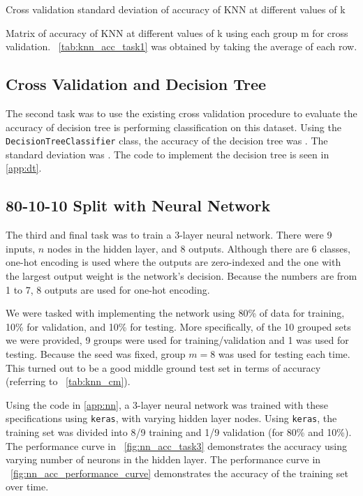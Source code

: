 \documentclass[paper=a4, fontsize=11pt,twoside]{scrartcl}	%
\newcommand{\figref}[1]{\figurename~\ref{#1}}
\newcommand{\tabref}[1]{\tablename~\ref{#1}}
\begin{document}
\begin{table}[!t!h]
	\centering
	
	\caption{Cross validation standard deviation of accuracy of KNN at different values of k}
	\label{tab:knn_std_task1}
\end{table}

\begin{table}[!t!h]
	\centering
	
	\caption{Matrix of accuracy of KNN at different values of k using each group m for cross validation. \tabref{tab:knn_acc_task1} was obtained by taking the average of each row.}
	\label{tab:knn_cm}
\end{table}

\subsection{Cross Validation and Decision Tree}
The second task was to use the existing cross validation procedure to evaluate the accuracy of decision tree is performing classification on this dataset. Using the \texttt{DecisionTreeClassifier} class, the accuracy of the decision tree was . The standard deviation was . The code to implement the decision tree is seen in \ref{app:dt}.

\subsection{80-10-10 Split with Neural Network}
The third and final task was to train a 3-layer neural network. There were 9 inputs, $n$ nodes in the hidden layer, and 8 outputs. Although there are 6 classes, one-hot encoding is used where the outputs are zero-indexed and the one with the largest output weight is the network's decision. Because the numbers are from 1 to 7, 8 outputs are used for one-hot encoding.

We were tasked with implementing the network using 80\% of data for training, 10\% for validation, and 10\% for testing. More specifically, of the 10 grouped sets we were provided, 9 groups were used for training/validation and 1 was used for testing. Because the seed was fixed, group $m=8$ was used for testing each time. This turned out to be a good middle ground test set in terms of accuracy (referring to \tabref{tab:knn_cm}).

Using the code in \ref{app:nn}, a 3-layer neural network was trained with these specifications using \texttt{keras}, with varying hidden layer nodes. Using \texttt{keras}, the training set was divided into 8/9 training and 1/9 validation (for 80\% and 10\%). The performance curve in \figref{fig:nn_acc_task3} demonstrates the accuracy using varying number of neurons in the hidden layer. The performance curve in \figref{fig:nn_acc_performance_curve} demonstrates the accuracy of the training set over time.
\end{document}

